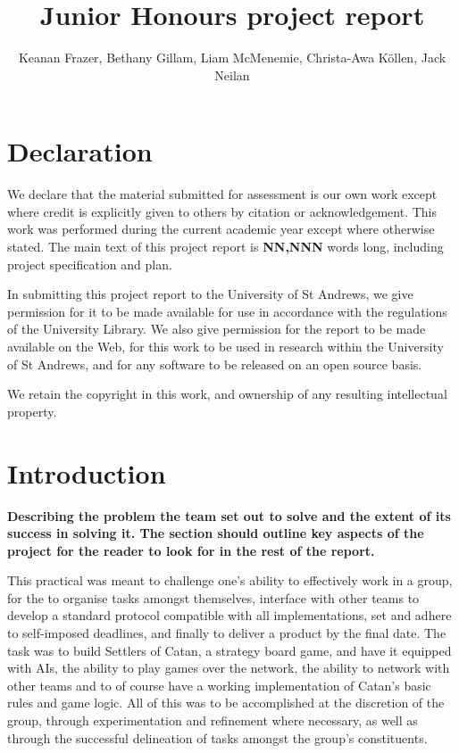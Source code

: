 \documentclass[a4paper,doc,draftfirst]{apa6}
\title{Junior Honours project report}
\author{Keanan Frazer, Bethany Gillam, Liam McMenemie, Christa-Awa Köllen, Jack Neilan}
\affiliation{University of St Andrews}
\begin{document}
\maketitle




\section{Declaration}
We declare that the material submitted for assessment is our own work except where credit is explicitly given to others by citation or acknowledgement. This work was performed during the current academic year except where otherwise stated. The main text of this project report is \textbf{NN,NNN} words long, including project specification and plan.

In submitting this project report to the University of St Andrews, we give permission for it to be made available for use in accordance with the regulations of the University Library. We also give permission for the report to be made available on the Web, for this work to be used in research within the University of St Andrews, and for any software to be released on an open source basis.

We retain the copyright in this work, and ownership of any resulting intellectual property.




\newpage
\tableofcontents
\newpage




\section{Introduction}
\textbf{Describing the problem the team set out to solve and the extent of its success in solving it. The section should outline key aspects of the project for the reader to look for in the rest of the report.}

This practical was meant to challenge one’s ability to effectively work in a group, for the to organise tasks amongst themselves, interface with other teams to develop a standard protocol compatible with all implementations, set and adhere to self-imposed deadlines, and finally to deliver a product by the final date. The task was to build Settlers of Catan, a strategy board game, and have it equipped with AIs, the ability to play games over the network, the ability to network with other teams and to of course have a working implementation of Catan’s basic rules and game logic. All of this was to be accomplished at the discretion of the group, through experimentation and refinement where necessary, as well as through the successful delineation of tasks amongst the group’s constituents.
\end{document}
